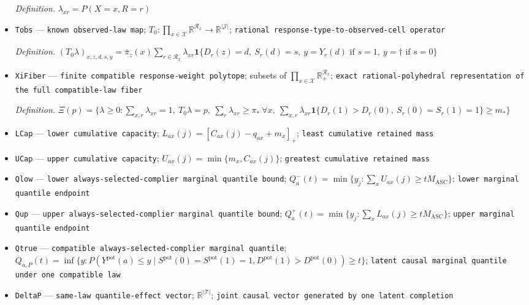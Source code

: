 \documentclass{article}
\begin{document}
\begin{itemize}
  \par\smallskip\noindent\emph{Definition.} \(\lambda_{xr}=P(X=x,R=r)\)
  \item \texttt{Tobs} --- \texttt{known observed-\allowbreak{}law map}; \(T_0:\prod_{x\in\mathcal X}\mathbb R^{\mathcal R_x}\to\mathbb R^{|\mathcal J|}\); \texttt{rational response-\allowbreak{}type-\allowbreak{}to-\allowbreak{}observed-\allowbreak{}cell operator}
  \par\smallskip\noindent\emph{Definition.} \((T_0\lambda)_{x,z,d,s,y}=\bar\pi_z(x)\sum_{r\in\mathcal R_x}\lambda_{xr}\mathbf 1\{D_r(z)=d,\ S_r(d)=s,\ y=Y_r(d)\text{ if }s=1,\ y=\dagger\text{ if }s=0\}\)
  \item \texttt{XiFiber} --- \texttt{finite compatible response-\allowbreak{}weight polytope}; subsets of \(\prod_{x\in\mathcal X}\mathbb R_{+}^{\mathcal R_x}\); \texttt{exact rational-\allowbreak{}polyhedral representation of the full compatible-\allowbreak{}law fiber}
  \par\smallskip\noindent\emph{Definition.} \(\Xi(p)=\{\lambda\ge0:\sum_{x,r}\lambda_{xr}=1,\ T_0\lambda=p,\ \sum_r\lambda_{xr}\ge\pi_*\ \forall x,\ \sum_{x,r}\lambda_{xr}\mathbf 1\{D_r(1)>D_r(0),\ S_r(0)=S_r(1)=1\}\ge m_*\}\)
  \item \texttt{LCap} --- \texttt{lower cumulative capacity}; \(L_{ax}(j)=[C_{ax}(j)-q_{ax}+m_x]_{+}\); \texttt{least cumulative retained mass}
  \item \texttt{UCap} --- \texttt{upper cumulative capacity}; \(U_{ax}(j)=\min\{m_x,C_{ax}(j)\}\); \texttt{greatest cumulative retained mass}
  \item \texttt{Qlow} --- \texttt{lower always-\allowbreak{}selected-\allowbreak{}complier marginal quantile bound}; \(Q_a^{-}(t)=\min\{y_j:\sum_xU_{ax}(j)\ge tM_{\mathrm{ASC}}\}\); \texttt{lower marginal quantile endpoint}
  \item \texttt{Qup} --- \texttt{upper always-\allowbreak{}selected-\allowbreak{}complier marginal quantile bound}; \(Q_a^{+}(t)=\min\{y_j:\sum_xL_{ax}(j)\ge tM_{\mathrm{ASC}}\}\); \texttt{upper marginal quantile endpoint}
  \item \texttt{Qtrue} --- \texttt{compatible always-\allowbreak{}selected-\allowbreak{}complier marginal quantile}; \(Q_{a,P}(t)=\inf\{y:P(Y^{\mathrm{pot}}(a)\le y\mid S^{\mathrm{pot}}(0)=S^{\mathrm{pot}}(1)=1,D^{\mathrm{pot}}(1)>D^{\mathrm{pot}}(0))\ge t\}\); \texttt{latent causal marginal quantile under one compatible law}
  \item \texttt{DeltaP} --- \texttt{same-\allowbreak{}law quantile-\allowbreak{}effect vector}; \(\mathbb R^{|\mathcal T|}\); \texttt{joint causal vector generated by one latent completion}

\end{itemize}
\end{document}
